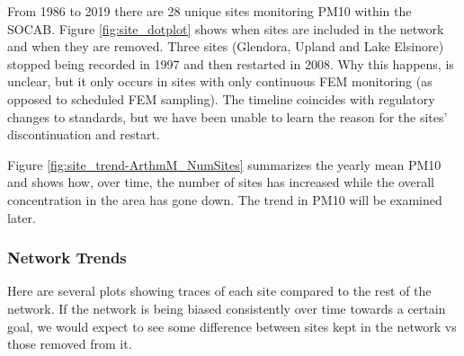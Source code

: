 \documentclass{article}
\begin{document}
From 1986 to 2019 there are 28 unique sites monitoring \ac{PM10} within the \ac{SOCAB}. Figure \ref{fig:site_dotplot} shows when sites are included in the network and when they are removed.   Three sites (Glendora, Upland and Lake Elsinore) stopped being recorded in 1997 and then restarted in 2008. Why this happens, is unclear, but it only occurs in sites with only continuous \ac{FEM} monitoring (as opposed to scheduled \ac{FEM} sampling).  The timeline coincides with regulatory changes to standards, but we have been unable to learn the reason for the sites' discontinuation and restart.

Figure \ref{fig:site_trend-ArthmM_NumSites} summarizes the yearly mean \ac{PM10} and shows how, over time, the number of sites has increased while the overall concentration in the area has gone down. The trend in \ac{PM10} will be examined later. 

\subsubsection*{Network Trends}
\label{subsubsec:networktrends}
Here are several plots showing traces of each site compared to the rest of the network.  If the network is being biased consistently over time towards a certain goal, we would expect to see some difference between sites kept in the network vs those removed from it.  
\end{document}
